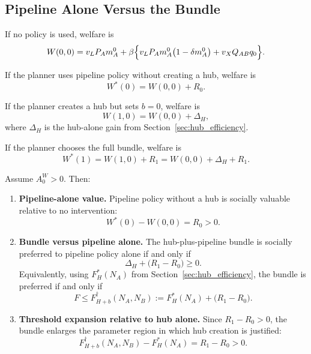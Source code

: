 \subsection{Pipeline Alone Versus the Bundle}

If no policy is used, welfare is
\begin{equation}
W(0,0)
=
v_L P_A m_A^0
+
\beta\Bigl\{
v_L P_A m_A^0\bigl(1-\delta m_A^0\bigr)
+
v_X Q_{AB}q_0
\Bigr\}.
\label{eq:W00}
\end{equation}

If the planner uses pipeline policy without creating a hub, welfare is
\begin{equation}
W^*(0)=W(0,0)+R_0.
\label{eq:W0star}
\end{equation}

If the planner creates a hub but sets $b=0$, welfare is
\begin{equation}
W(1,0)=W(0,0)+\Delta_H,
\label{eq:W10}
\end{equation}
where $\Delta_H$ is the hub-alone gain from Section~\ref{sec:hub_efficiency}.

If the planner chooses the full bundle, welfare is
\begin{equation}
W^*(1)=W(1,0)+R_1=W(0,0)+\Delta_H+R_1.
\label{eq:W1star}
\end{equation}

\begin{proposition}
\label{prop:hub_plus_refresh_efficiency}
Assume $A_0^W>0$. Then:

\begin{enumerate}[leftmargin=2em]
    \item \textbf{Pipeline-alone value.}
    Pipeline policy without a hub is socially valuable relative to no intervention:
    \begin{equation}
    W^*(0)-W(0,0)=R_0>0.
    \label{eq:pipeline_alone_positive}
    \end{equation}

    \item \textbf{Bundle versus pipeline alone.}
    The hub-plus-pipeline bundle is socially preferred to pipeline policy alone if and only if
    \begin{equation}
    \Delta_H+\bigl(R_1-R_0\bigr)\ge 0.
    \label{eq:bundle_vs_pipeline}
    \end{equation}
    Equivalently, using $F_H^*(N_A)$ from Section~\ref{sec:hub_efficiency}, the bundle is preferred if and only if
    \begin{equation}
    F\le F_{H+b}^{\dagger}(N_A,N_B)
    :=
    F_H^*(N_A)+\bigl(R_1-R_0\bigr).
    \label{eq:Fdagger}
    \end{equation}

    \item \textbf{Threshold expansion relative to hub alone.}
    Since $R_1-R_0>0$, the bundle enlarges the parameter region in which hub creation is justified:
    \begin{equation}
    F_{H+b}^{\dagger}(N_A,N_B)-F_H^*(N_A)=R_1-R_0>0.
    \label{eq:threshold_expansion}
    \end{equation}
\end{enumerate}
\end{proposition}

